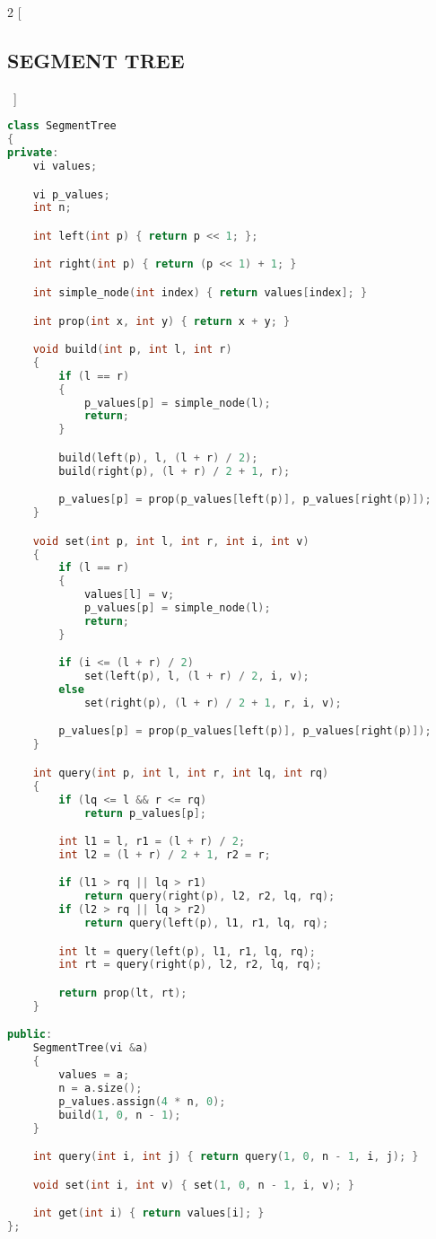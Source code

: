 \documentclass[leter]{amsart}
\begin{document}
\begin{multicols}{2}
[\subsection{SEGMENT TREE}\ ]
\begin{lstlisting}[language=C++]
class SegmentTree
{
private:
    vi values;

    vi p_values;
    int n;

    int left(int p) { return p << 1; };

    int right(int p) { return (p << 1) + 1; }

    int simple_node(int index) { return values[index]; }

    int prop(int x, int y) { return x + y; }

    void build(int p, int l, int r)
    {
        if (l == r)
        {
            p_values[p] = simple_node(l);
            return;
        }

        build(left(p), l, (l + r) / 2);
        build(right(p), (l + r) / 2 + 1, r);

        p_values[p] = prop(p_values[left(p)], p_values[right(p)]);
    }

    void set(int p, int l, int r, int i, int v)
    {
        if (l == r)
        {
            values[l] = v;
            p_values[p] = simple_node(l);
            return;
        }

        if (i <= (l + r) / 2)
            set(left(p), l, (l + r) / 2, i, v);
        else
            set(right(p), (l + r) / 2 + 1, r, i, v);

        p_values[p] = prop(p_values[left(p)], p_values[right(p)]);
    }

    int query(int p, int l, int r, int lq, int rq)
    {
        if (lq <= l && r <= rq)
            return p_values[p];

        int l1 = l, r1 = (l + r) / 2;
        int l2 = (l + r) / 2 + 1, r2 = r;

        if (l1 > rq || lq > r1)
            return query(right(p), l2, r2, lq, rq);
        if (l2 > rq || lq > r2)
            return query(left(p), l1, r1, lq, rq);

        int lt = query(left(p), l1, r1, lq, rq);
        int rt = query(right(p), l2, r2, lq, rq);

        return prop(lt, rt);
    }

public:
    SegmentTree(vi &a)
    {
        values = a;
        n = a.size();
        p_values.assign(4 * n, 0);
        build(1, 0, n - 1);
    }

    int query(int i, int j) { return query(1, 0, n - 1, i, j); }

    void set(int i, int v) { set(1, 0, n - 1, i, v); }

    int get(int i) { return values[i]; }
};

\end{lstlisting}
\end{multicols}
\end{document}
